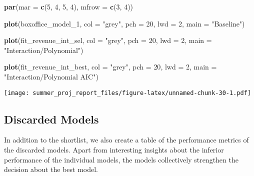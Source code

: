 \documentclass[
]{article}
\newenvironment{Shaded}{\begin{snugshade}}{\end{snugshade}}
\newcommand{\DataTypeTok}[1]{\textcolor[rgb]{0.13,0.29,0.53}{#1}}
\newcommand{\DecValTok}[1]{\textcolor[rgb]{0.00,0.00,0.81}{#1}}
\newcommand{\KeywordTok}[1]{\textcolor[rgb]{0.13,0.29,0.53}{\textbf{#1}}}
\newcommand{\NormalTok}[1]{#1}
\newcommand{\OperatorTok}[1]{\textcolor[rgb]{0.81,0.36,0.00}{\textbf{#1}}}
\newcommand{\StringTok}[1]{\textcolor[rgb]{0.31,0.60,0.02}{#1}}
\begin{document}
\begin{Shaded}
\begin{Highlighting}[]
\KeywordTok{par}\NormalTok{(}\DataTypeTok{mar =} \KeywordTok{c}\NormalTok{(}\DecValTok{5}\NormalTok{, }\DecValTok{4}\NormalTok{, }\DecValTok{5}\NormalTok{, }\DecValTok{4}\NormalTok{), }\DataTypeTok{mfrow =} \KeywordTok{c}\NormalTok{(}\DecValTok{3}\NormalTok{, }\DecValTok{4}\NormalTok{))}

\KeywordTok{plot}\NormalTok{(boxoffice_model_}\DecValTok{1}\NormalTok{,          }
     \DataTypeTok{col =} \StringTok{"grey"}\NormalTok{,}
     \DataTypeTok{pch =} \DecValTok{20}\NormalTok{,}
     \DataTypeTok{lwd =} \DecValTok{2}\NormalTok{,}
     \DataTypeTok{main =} \StringTok{"Baseline"}\NormalTok{)}

\KeywordTok{plot}\NormalTok{(fit_revenue_int_sel,          }
     \DataTypeTok{col =} \StringTok{"grey"}\NormalTok{,}
     \DataTypeTok{pch =} \DecValTok{20}\NormalTok{,}
     \DataTypeTok{lwd =} \DecValTok{2}\NormalTok{,}
     \DataTypeTok{main =} \StringTok{"Interaction/Polynomial"}\NormalTok{)}

\KeywordTok{plot}\NormalTok{(fit_revenue_int_best,          }
     \DataTypeTok{col =} \StringTok{"grey"}\NormalTok{,}
     \DataTypeTok{pch =} \DecValTok{20}\NormalTok{,}
     \DataTypeTok{lwd =} \DecValTok{2}\NormalTok{,}
     \DataTypeTok{main =} \StringTok{"Interaction/Polynomial AIC"}\NormalTok{)}
\end{Highlighting}
\end{Shaded}

\texttt{[image: summer\_proj\_report\_files/figure-latex/unnamed-chunk-30-1.pdf]}

\hypertarget{discarded-models}{%
\subsection{Discarded Models}\label{discarded-models}}

In addition to the shortlist, we also create a table of the performance
metrics of the discarded models. Apart from interesting insights about
the inferior performance of the individual models, the models
collectively strengthen the decision about the best model.

\begin{Shaded}
\end{Shaded}
\end{document}
